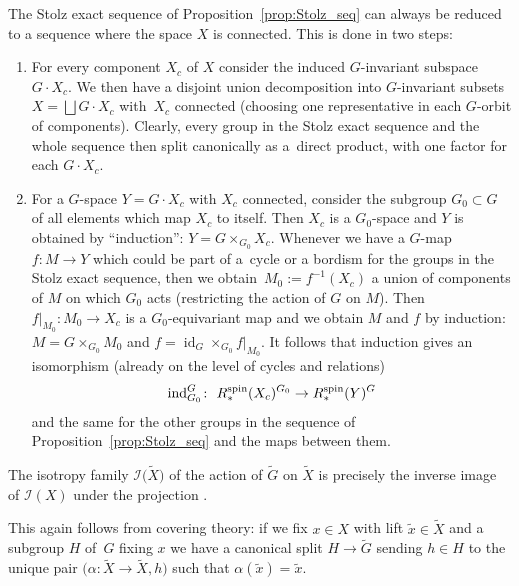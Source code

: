 \documentclass[pdftex]{sigma}
\numberwithin{equation}{section}
\DeclareMathOperator{\id}{id}
\newcommand{\bigdisjointunion}{\bigsqcup}
\begin{document}
	\begin{Remark}
		The Stolz exact sequence of Proposition~\ref{prop:Stolz_seq} can always be
		reduced to a sequence where the space $X$ is connected. This is done in two
		steps:
		\begin{enumerate}\itemsep=0pt
			\item[(1)] For every component $X_c$ of $X$ consider the induced $G$-invariant
			subspace $G\cdot X_c$. We then have a disjoint union decomposition into
			$G$-invariant subsets $X=\bigdisjointunion G\cdot X_c$ with~$X_c$ connected
			(choosing one representative in each $G$-orbit of components).
			Clearly, every group in the Stolz exact sequence and the whole sequence
			then split canonically as a~direct product, with one factor for each
			$G\cdot X_c$.
			\item[(2)] For a $G$-space $Y=G\cdot X_c$ with $X_c$ connected, consider the
			subgroup $G_0\subset G$ of all elements which map $X_c$ to itself. Then
			$X_c$ is a $G_0$-space and $Y$ is obtained by ``induction'': $Y=
			G\times_{G_0}X_c$. Whenever we have a $G$-map $f\colon M\to Y$ which
			could be part of a~cycle or a bordism for the groups in the Stolz exact
			sequence, then we obtain~${M_0:=f^{-1}(X_c)}$ a union of components of $M$
			on which $G_0$ acts (restricting the action of $G$ on $M$). Then~${f|_{M_0}\colon M_0\to X_c}$ is a $G_0$-equivariant map and we obtain $M$ and
			$f$ by induction: $M=G\times_{G_0} M_0$ and $f=\id_G\times_{G_0}
			f|_{M_0}$.
			It follows that induction gives an isomorphism (already on the level of
			cycles and relations)
			\begin{equation*}
				\mathrm{ind}_{G_0}^G\colon\ R^{\rm spin}_*(X_c)^{G_0}\to R^{\rm spin}_*(Y)^G
			\end{equation*}
			and the same for the other groups in the sequence of Proposition~\ref{prop:Stolz_seq}
			and the maps between them.
		\end{enumerate}
	\end{Remark}
	
	\begin{Remark}
		The isotropy family $\mathcal{I}\bigl(\tilde{X}\bigr)$ of the action of $\widetilde{G}$
		on $\tilde{X}$ is precisely the inverse image of $\mathcal{I}(X)$ under the projection
		\smash{$\widetilde{G}\to G$}.
		
		This again follows from covering theory: if we fix $x\in X$ with lift
		$\tilde x\in\tilde{X}$ and a subgroup $H$ of~$G$ fixing $x$ we have a
		canonical split $H\to \widetilde{G}$ sending $h\in H$ to the unique pair
		$\bigl(\alpha\colon \tilde X\to \tilde{X},h\bigr)$ such that $\alpha(\tilde x)=\tilde
		x$.
	\end{Remark}
	
\end{document}
